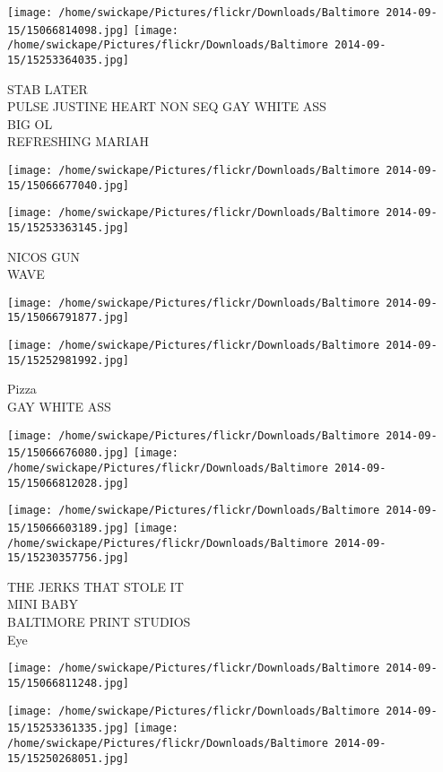 \documentclass[10pt,letterpaper]{article}
\begin{document}
\texttt{[image: /home/swickape/Pictures/flickr/Downloads/Baltimore 2014-09-15/15066814098.jpg]}
\texttt{[image: /home/swickape/Pictures/flickr/Downloads/Baltimore 2014-09-15/15253364035.jpg]}

STAB LATER\\
PULSE JUSTINE HEART NON SEQ GAY WHITE ASS\\
BIG OL\\
REFRESHING MARIAH\\
\pagebreak

\texttt{[image: /home/swickape/Pictures/flickr/Downloads/Baltimore 2014-09-15/15066677040.jpg]}

\vspace{0.25in}
\texttt{[image: /home/swickape/Pictures/flickr/Downloads/Baltimore 2014-09-15/15253363145.jpg]}

NICOS GUN\\
WAVE\\
\pagebreak

\texttt{[image: /home/swickape/Pictures/flickr/Downloads/Baltimore 2014-09-15/15066791877.jpg]}

\vspace{0.25in}
\texttt{[image: /home/swickape/Pictures/flickr/Downloads/Baltimore 2014-09-15/15252981992.jpg]}

Pizza\\
GAY WHITE ASS\\
\pagebreak

\texttt{[image: /home/swickape/Pictures/flickr/Downloads/Baltimore 2014-09-15/15066676080.jpg]}
\texttt{[image: /home/swickape/Pictures/flickr/Downloads/Baltimore 2014-09-15/15066812028.jpg]}

\texttt{[image: /home/swickape/Pictures/flickr/Downloads/Baltimore 2014-09-15/15066603189.jpg]}
\texttt{[image: /home/swickape/Pictures/flickr/Downloads/Baltimore 2014-09-15/15230357756.jpg]}

THE JERKS THAT STOLE IT\\
MINI BABY\\
BALTIMORE PRINT STUDIOS\\
Eye\\
\pagebreak

\texttt{[image: /home/swickape/Pictures/flickr/Downloads/Baltimore 2014-09-15/15066811248.jpg]}

\vspace{0.25in}
\texttt{[image: /home/swickape/Pictures/flickr/Downloads/Baltimore 2014-09-15/15253361335.jpg]}
\texttt{[image: /home/swickape/Pictures/flickr/Downloads/Baltimore 2014-09-15/15250268051.jpg]}
\end{document}
